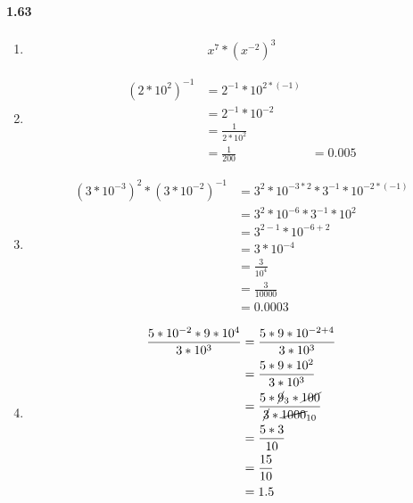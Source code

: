 \documentclass{article}
\newcommand\litem[1]{\item{\bfseries#1\space}}
\begin{document}
\paragraph{1.63}
\begin{enumerate}[label=\emph{\alph*})]
\litem{
\begin{align*}
  x^7 * \left(x^{-2}\right)^3
\end{align*}
}
\litem{
\begin{align*}
  \left(2 * 10^2\right)^{-1} &= 2^{-1} * 10^{2 * (-1)} \\
  &= 2^{-1} * 10^{-2} \\
  &= \frac{1}{2 * 10^2} \\ 
  &= \frac{1}{200}
  &= 0.005
\end{align*}
}
\litem{
\begin{align*}
  \left(3 * 10^{-3}\right)^2 * \left(3 * 10^{-2}\right)^{-1} &= 3^2 * 10^{-3 * 2} * 3^{-1} * 10^{-2 * (-1)} \\
  &= 3^2 * 10^{-6} * 3^{-1} * 10^2 \\
  &= 3^{2-1} * 10^{-6 + 2} \\
  &= 3 * 10^{-4} \\
  &= \frac{3}{10^4} \\
  &= \frac{3}{10000} \\
  &= 0.0003
\end{align*}
}
\litem{
\begin{align*}
  \frac{5 * 10^{-2} * 9 * 10^4}{3 * 10^3} &= \frac{5 * 9 * 10^{-2 + 4}}{3 * 10^3} \\
  &= \frac{5 * 9 * 10^{2}}{3 * 10^3} \\
  &= \frac{5 * \cancel{9}_3 * \cancel{100}}{\cancel{3} * \cancel{1000}_{10}} \\
  &= \frac{5 * 3}{10} \\ 
  &= \frac{15}{10} \\
  &= 1.5
\end{align*}
}
\end{enumerate}
\end{document}
